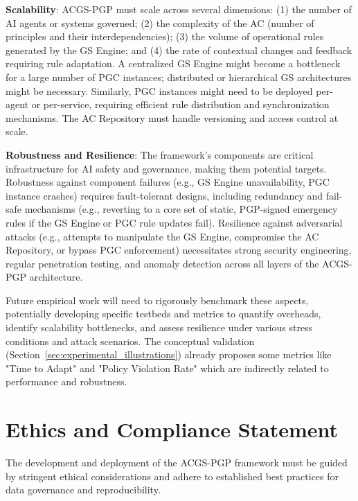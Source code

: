 \documentclass[sigconf,review,anonymous=false]{acmart} %
\begin{document}
\textbf{Scalability}: ACGS-PGP must scale across several dimensions: (1) the number of AI agents or systems governed; (2) the complexity of the AC (number of principles and their interdependencies); (3) the volume of operational rules generated by the GS Engine; and (4) the rate of contextual changes and feedback requiring rule adaptation. A centralized GS Engine might become a bottleneck for a large number of PGC instances; distributed or hierarchical GS architectures might be necessary. Similarly, PGC instances might need to be deployed per-agent or per-service, requiring efficient rule distribution and synchronization mechanisms. The AC Repository must handle versioning and access control at scale.

\textbf{Robustness and Resilience}: The framework's components are critical infrastructure for AI safety and governance, making them potential targets. Robustness against component failures (e.g., GS Engine unavailability, PGC instance crashes) requires fault-tolerant designs, including redundancy and fail-safe mechanisms (e.g., reverting to a core set of static, PGP-signed emergency rules if the GS Engine or PGC rule updates fail). Resilience against adversarial attacks (e.g., attempts to manipulate the GS Engine, compromise the AC Repository, or bypass PGC enforcement) necessitates strong security engineering, regular penetration testing, and anomaly detection across all layers of the ACGS-PGP architecture.

Future empirical work will need to rigorously benchmark these aspects, potentially developing specific testbeds and metrics to quantify overheads, identify scalability bottlenecks, and assess resilience under various stress conditions and attack scenarios. The conceptual validation (Section~\ref{sec:experimental_illustrations}) already proposes some metrics like "Time to Adapt" and "Policy Violation Rate" which are indirectly related to performance and robustness.

\section{Ethics and Compliance Statement}
\label{sec:ethics_compliance_statement}
The development and deployment of the ACGS-PGP framework must be guided by stringent ethical considerations and adhere to established best practices for data governance and reproducibility.
\end{document}
